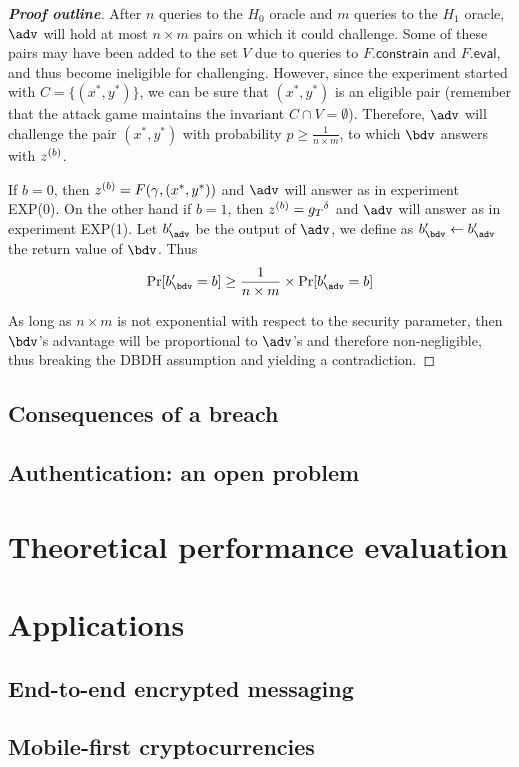 \begin{proof}[\textbf{Proof outline}]
			After $n$ queries to the $H_0$ oracle and $m$ queries to the $H_1$ oracle, $\adv$ will hold at most $n \times m$ pairs on which it could challenge.	 Some of these pairs may have been added to the set $V$ due to queries to $F.\mathsf{constrain}$ and $F.\mathsf{eval}$, and thus become ineligible for challenging. However, since the experiment started with $C = \{(x^*,y^*)\}$, we can be sure that $(x^*,y^*)$ is an eligible pair (remember that the attack game maintains the invariant $C \cap V = \emptyset$). Therefore, $\adv$ will challenge the pair $(x^*,y^*)$ with probability $p \geq \frac{1}{n\times m}$, to which $\bdv$ answers with $z^{(b)}$. 
			
			If $b=0$, then $z^{(b)} = F(\gamma, (x^*, y^*))$ and $\adv$ will answer as in experiment EXP(0). On the other hand if $b=1$, then $z^{(b)} = {g_T}^{\delta}$ and $\adv$ will answer as in experiment EXP(1). Let $b'_\adv$ be the output of $\adv$, we define as $b'_\bdv \leftarrow b'_\adv$ the return value of $\bdv$. Thus
			\begin{equation}
				\Pr[b'_\bdv = b] \geq \frac{1}{n \times m} \times \Pr[b'_\adv = b]
			\end{equation}
			
			As long as ${n \times m}$ is not exponential with respect to the security parameter, then $\bdv$'s advantage will be proportional to $\adv$'s and therefore non-negligible, thus breaking the DBDH assumption and yielding a contradiction.
		\end{proof}


	\subsection{Consequences of a breach}
	
	\subsection{Authentication: an open problem}


\section{Theoretical performance evaluation}
\label{sec:performance}


\section{Applications}
\label{sec:applications}

	\subsection{End-to-end encrypted messaging}
	
	\subsection{Mobile-first cryptocurrencies}
